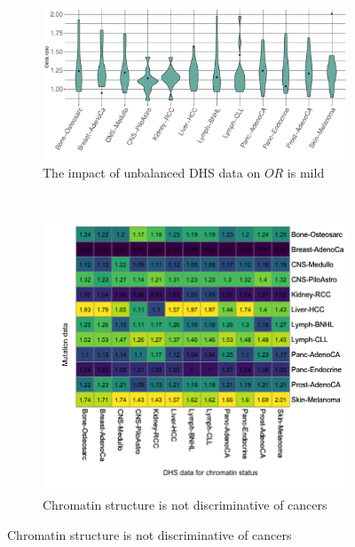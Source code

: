 \begin{figure}[htbp]
    \begin{subfigure}{\textwidth}
    \centering
    \includegraphics[scale=0.55]{graphics/mixed_or_violin.pdf}
    \caption{The impact of unbalanced DHS data on $OR$ is mild}
    \label{fig:mixed_or_violin}
    \end{subfigure} \\
    
    \vspace{0.2cm}
    \begin{subfigure}{\textwidth}
    \centering
    \includegraphics[scale=0.58]{graphics/mixed_or_heatmap.png}
    \caption{Chromatin structure is not discriminative of cancers}
    \label{fig:mixed_or_heatmap}
    \end{subfigure} 


\end{figure}

